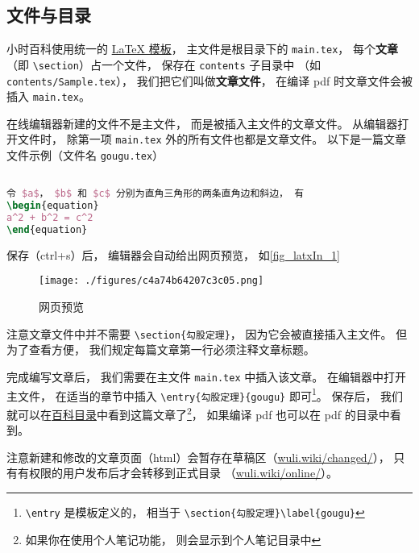 

\subsection{文件与目录}

小时百科使用统一的 \href{https://github.com/MacroUniverse/PhysWiki}{LaTeX 模板}， 主文件是根目录下的 \verb`main.tex`， 每个\textbf{文章}（即 \verb`\section`）占一个文件， 保存在 \verb`contents` 子目录中 （如 \verb`contents/Sample.tex`）， 我们把它们叫做\textbf{文章文件}， 在编译 pdf 时文章文件会被插入 \verb`main.tex`。

在线编辑器新建的文件不是主文件， 而是被插入主文件的文章文件。 从编辑器打开文件时， 除第一项 \verb`main.tex` 外的所有文件也都是文章文件。 以下是一篇文章文件示例（文件名 \verb`gougu.tex`）

\begin{lstlisting}[language=latex]
% 勾股定理

令 $a$， $b$ 和 $c$ 分别为直角三角形的两条直角边和斜边， 有
\begin{equation}
a^2 + b^2 = c^2
\end{equation}
\end{lstlisting}
保存（ctrl+s）后， 编辑器会自动给出网页预览， 如\autoref{fig_latxIn_1} 
\begin{figure}[ht]
\centering
\texttt{[image: ./figures/c4a74b64207c3c05.png]}
\caption{网页预览} \label{fig_editIn_1}
\end{figure}

注意文章文件中并不需要 \verb`\section{勾股定理}`， 因为它会被直接插入主文件。 但为了查看方便， 我们规定每篇文章第一行必须注释文章标题。

完成编写文章后， 我们需要在主文件 \verb`main.tex` 中插入该文章。 在编辑器中打开主文件， 在适当的章节中插入 \verb`\entry{勾股定理}{gougu}` 即可\footnote{\verb`\entry` 是模板定义的， 相当于 \verb`\section{勾股定理}\label{gougu}`}。 保存后， 我们就可以在\href{https://wuli.wiki/changed}{百科目录}中看到这篇文章了\footnote{如果你在使用个人笔记功能， 则会显示到个人笔记目录中}， 如果编译 pdf 也可以在 pdf 的目录中看到。

注意新建和修改的文章页面（html）会暂存在草稿区（\href{https://wuli.wiki/changed/}{wuli.wiki/changed/}）， 只有有权限的用户发布后才会转移到正式目录 （\href{https://wuli.wiki/online/}{wuli.wiki/online/}）。
